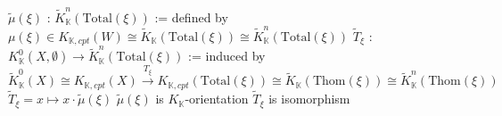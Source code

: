 \documentclass[dvipdfmx]{jsarticle}
\newcommand{\KtheoryReduced}[1]{\tilde{K}_{\mathbb{K}}(#1)}
\newcommand{\Kcohomology}[3]{K_{\mathbb{K}}^{#1}(#2, #3)}
\newcommand{\KcohomologyReduced}[2]{\tilde{K}_{\mathbb{K}}^{#1}(#2)}
\newcommand{\KtheoryCpx}[1]{K_{\mathbb{K},cpt}(#1)}
\newcommand{\KtheoryCpxRel}[2]{K_{\mathbb{K},cpt}(#1, #2)}
\begin{document}

\begin{Theorem}
\itemdefi
  \Let \(\tilde{\mu}(\xi)\) : \(\KcohomologyReduced{n}{\text{Total}(\xi)}\) := defined by \(\mu(\xi) \in \KtheoryCpx{W} \cong \KtheoryReduced{\text{Total}(\xi)} \cong \KcohomologyReduced{n}{\text{Total}(\xi)}\)
\itemprop
  \Let \(\tilde{T}_{\xi}\) : \(\Kcohomology{0}{X}{\emptyset} \to \KcohomologyReduced{n}{\text{Total}(\xi)}\) := induced by \\
  \(\KcohomologyReduced{0}{X} \cong \KtheoryCpx{X} \overset{T_{\xi}}{\to} \KtheoryCpx{\text{Total}(\xi)} \cong \KtheoryReduced{\text{Thom}(\xi)} \cong \KcohomologyReduced{n}{\text{Thom}(\xi)}\) \\
  \Then \(\tilde{T}_{\xi} = x \mapsto x \cdot \tilde{\mu}(\xi)\)
\itemprop
  \Then \(\tilde{\mu}(\xi)\) is \(K_{\mathbb{K}}\)-orientation
\itemprop
  \Then \(\tilde{T}_{\xi}\) is isomorphism
\end{Theorem}
\end{document}
